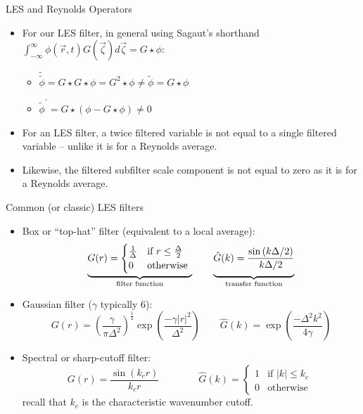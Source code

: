 \begin{frame}{LES and Reynolds Operators}

\begin{itemize}
	\item For our LES filter, in general using Sagaut's shorthand $\int_{-\infty}^{\infty} \phi(\vec{r},t)G(\vec{\zeta}) d\vec{\zeta} = G \star \phi$:
	\begin{itemize}
		\item $\tilde{\tilde \phi} = G \star G \star \phi = G^2 \star \phi \neq \tilde \phi = G \star \phi$
		\item $\tilde \phi^{\prime} = G \star (\phi - G \star \phi) \neq 0$
	\end{itemize}
	\item For an LES filter, a twice filtered variable is not equal to a single filtered variable -- unlike it is for a Reynolds average.
	\item Likewise, the filtered subfilter scale component is not equal to zero as it is for a Reynolds average.
\end{itemize}
\end{frame}

\begin{frame}{Common (or classic) LES filters}

\begin{itemize}
	\item Box or ``top-hat'' filter (equivalent to a local average):
	$$\underbrace{G(r) = \begin{cases} \frac{1}{\Delta} &\mbox{if } r \leq \frac{\Delta}{2} \\ 0 & \mbox{otherwise }\end{cases}}_{\text{filter function}} \qquad \underbrace{\vphantom{\begin{cases} \frac{1}{\Delta} &\mbox{if } \vec{r} \leq \frac{\Delta}{2} \\ 0 & \mbox{otherwise }\end{cases}} \hat G(k) = \frac{\sin{(k\Delta/2)}}{k\Delta/2}}_{\text{transfer function}}$$
	\item Gaussian filter ($\gamma$ typically 6):
	$$G(r) = \left(\frac{\gamma}{\pi \Delta^2}\right)^{\frac{1}{2}} \exp{\left(\frac{-\gamma |r|^2 }{\Delta^2}\right)} \qquad \hat G(k) = \exp{\left(\frac{-\Delta^2 k^2}{4\gamma}\right)}$$
	\item Spectral or sharp-cutoff filter:
	$$G(r) = \frac{\sin (k_c r)}{k_c r} \qquad \qquad \hat G(k) = \begin{cases} 1 &\mbox{if } |k| \leq k_c \\ 0 & \mbox{otherwise }\end{cases}$$
	recall that $k_c$ is the characteristic wavenumber cutoff.
\end{itemize}
\end{frame}

